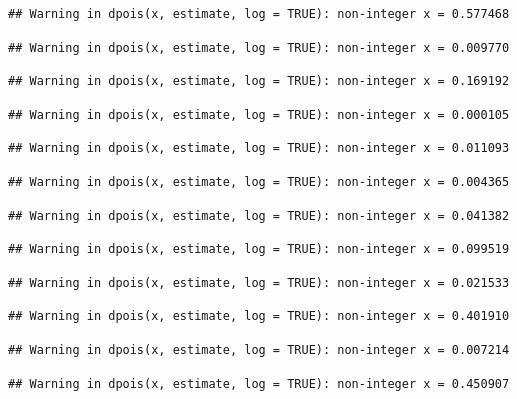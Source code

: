 \documentclass[]{article}
\begin{document}
\begin{verbatim}
## Warning in dpois(x, estimate, log = TRUE): non-integer x = 0.577468
\end{verbatim}

\begin{verbatim}
## Warning in dpois(x, estimate, log = TRUE): non-integer x = 0.009770
\end{verbatim}

\begin{verbatim}
## Warning in dpois(x, estimate, log = TRUE): non-integer x = 0.169192
\end{verbatim}

\begin{verbatim}
## Warning in dpois(x, estimate, log = TRUE): non-integer x = 0.000105
\end{verbatim}

\begin{verbatim}
## Warning in dpois(x, estimate, log = TRUE): non-integer x = 0.011093
\end{verbatim}

\begin{verbatim}
## Warning in dpois(x, estimate, log = TRUE): non-integer x = 0.004365
\end{verbatim}

\begin{verbatim}
## Warning in dpois(x, estimate, log = TRUE): non-integer x = 0.041382
\end{verbatim}

\begin{verbatim}
## Warning in dpois(x, estimate, log = TRUE): non-integer x = 0.099519
\end{verbatim}

\begin{verbatim}
## Warning in dpois(x, estimate, log = TRUE): non-integer x = 0.021533
\end{verbatim}

\begin{verbatim}
## Warning in dpois(x, estimate, log = TRUE): non-integer x = 0.401910
\end{verbatim}

\begin{verbatim}
## Warning in dpois(x, estimate, log = TRUE): non-integer x = 0.007214
\end{verbatim}

\begin{verbatim}
## Warning in dpois(x, estimate, log = TRUE): non-integer x = 0.450907
\end{verbatim}
\end{document}

